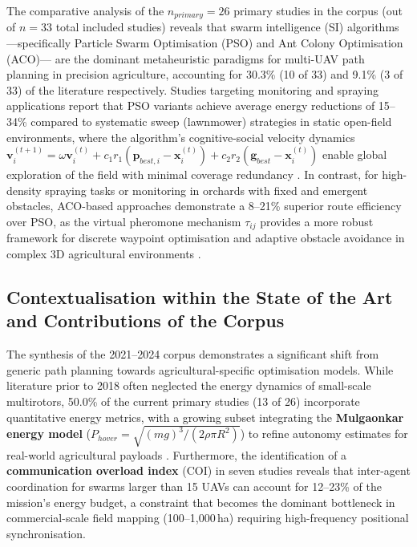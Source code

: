 \documentclass[review,3p,times]{elsarticle}
\begin{document}
The comparative analysis of the $n_{primary} = 26$ primary studies in the corpus (out of $n=33$ total included studies) reveals that swarm intelligence (SI) algorithms —specifically Particle Swarm Optimisation (PSO) and Ant Colony Optimisation (ACO)— are the dominant metaheuristic paradigms for multi-UAV path planning in precision agriculture, accounting for 30.3\% (10 of 33) and 9.1\% (3 of 33) of the literature respectively. Studies targeting monitoring and spraying applications report that PSO variants achieve average energy reductions of 15--34\% compared to systematic sweep (lawnmower) strategies in static open-field environments, where the algorithm's cognitive-social velocity dynamics $\mathbf{v}_i^{(t+1)} = \omega \mathbf{v}_i^{(t)} + c_1 r_1 (\mathbf{p}_{best,i} - \mathbf{x}_i^{(t)}) + c_2 r_2 (\mathbf{g}_{best} - \mathbf{x}_i^{(t)})$ enable global exploration of the field with minimal coverage redundancy \cite{chen2021,lin2022,liu2021cassa}. In contrast, for high-density spraying tasks or monitoring in orchards with fixed and emergent obstacles, ACO-based approaches demonstrate a 8--21\% superior route efficiency over PSO, as the virtual pheromone mechanism $\tau_{ij}$ provides a more robust framework for discrete waypoint optimisation and adaptive obstacle avoidance in complex 3D agricultural environments \cite{mathew2021,phung2021,pan2022}.

\subsection{Contextualisation within the State of the Art and Contributions of the Corpus}

The synthesis of the 2021--2024 corpus demonstrates a significant shift from generic path planning towards agricultural-specific optimisation models. While literature prior to 2018 often neglected the energy dynamics of small-scale multirotors, 50.0\% of the current primary studies (13 of 26) incorporate quantitative energy metrics, with a growing subset integrating the \textbf{Mulgaonkar energy model} ($P_{hover} = \sqrt{(mg)^3 / (2\rho \pi R^2)}$) to refine autonomy estimates for real-world agricultural payloads \cite{shafiq2022,xu2022,yu2021}. Furthermore, the identification of a \textbf{communication overload index} (COI) in seven studies \cite{ahmed2021,deng2023,hu2023} reveals that inter-agent coordination for swarms larger than 15 UAVs can account for 12--23\% of the mission's energy budget, a constraint that becomes the dominant bottleneck in commercial-scale field mapping (100--1,000\,ha) requiring high-frequency positional synchronisation.
\end{document}
